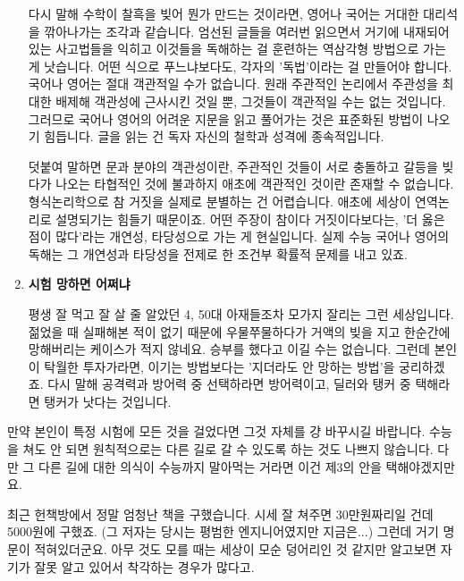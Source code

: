 \begin{enumerate}
    다시 말해 수학이 찰흑을 빚어 뭔가 만드는 것이라면, 영어나 국어는 거대한 대리석을 깎아나가는 조각과 같습니다.
    엄선된 글들을 여러번 읽으면서 거기에 내재되어있는 사고법들을 익히고 이것들을 독해하는 걸 훈련하는 역삼각형 방법으로 가는 게 낫습니다.
    어떤 식으로 푸느냐보다도, 각자의 '독법'이라는 걸 만들어야 합니다.
    국어나 영어는 절대 객관적일 수가 없습니다. 원래 주관적인 논리에서 주관성을 최대한 배제해 객관성에 근사시킨 것일 뿐,
    그것들이 객관적일 수는 없는 것입니다. 그러므로 국어나 영어의 어려운 지문을 읽고 풀어가는 것은 표준화된 방법이 나오기 힘듭니다.
    글을 읽는 건 독자 자신의 철학과 성격에 종속적입니다.
    \vspace{5mm}

    덧붙여 말하면 문과 분야의 객관성이란, 주관적인 것들이 서로 충돌하고 갈등을 빚다가 나오는 타협적인 것에 불과하지
    애초에 객관적인 것이란 존재할 수 없습니다.
    형식논리학으로 참 거짓을 실제로 분별하는 건 어렵습니다. 애초에 세상이 연역논리로 설명되기는 힘들기 때문이죠.
    어떤 주장이 참이다 거짓이다보다는, '더 옳은 점이 많다'라는 개연성, 타당성으로 가는 게 현실입니다.
    실제 수능 국어나 영어의 독해는 그 개연성과 타당성을 전제로 한 조건부 확률적 문제를 내고 있죠.
    \vspace{5mm}

    \item \textbf{시험 망하면 어쩌냐}
    \vspace{5mm}

    평생 잘 먹고 잘 살 줄 알았던 4, 50대 아재들조차 모가지 잘리는 그런 세상입니다.
    젊었을 때 실패해본 적이 없기 때문에 우물쭈물하다가 거액의 빚을 지고 한순간에 망해버리는 케이스가 적지 않네요.
    승부를 했다고 이길 수는 없습니다. 그런데 본인이 탁월한 투자가라면, 이기는 방법보다는 '지더라도 안 망하는 방법'을 궁리하겠죠.
    다시 말해 공격력과 방어력 중 선택하라면 방어력이고, 딜러와 탱커 중 택해라면 탱커가 낫다는 것입니다.
    \vspace{5mm}
\end{enumerate}
만약 본인이 특정 시험에 모든 것을 걸었다면 그것 자체를 걍 바꾸시길 바랍니다.
수능을 쳐도 안 되면 원칙적으로는 다른 길로 갈 수 있도록 하는 것도 나쁘지 않습니다.
다만 그 다른 길에 대한 의식이 수능까지 말아먹는 거라면 이건 제3의 안을 택해야겠지만요.
\vspace{5mm}

최근 헌책방에서 정말 엄청난 책을 구했습니다. 시세 잘 쳐주면 30만원짜리일 건데 5000원에 구했죠.
(그 저자는 당시는 평범한 엔지니어였지만 지금은...)
그런데 거기 명문이 적혀있더군요. 아무 것도 모를 때는 세상이 모순 덩어리인 것 같지만
알고보면 자기가 잘못 알고 있어서 착각하는 경우가 많다고.
\vspace{5mm}

